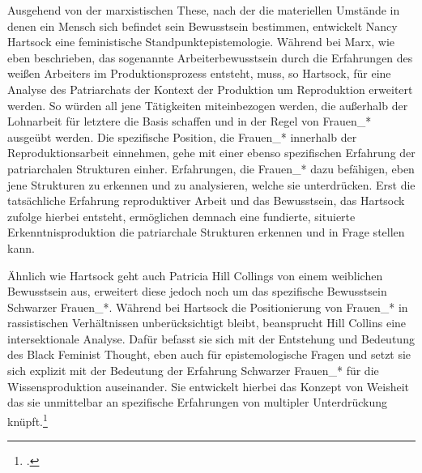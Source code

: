 Ausgehend von der marxistischen These, nach der die materiellen Umstände in
denen ein Mensch sich befindet sein Bewusstsein bestimmen, entwickelt Nancy
Hartsock eine feministische Standpunktepistemologie. Während bei Marx, wie eben
beschrieben, das sogenannte Arbeiterbewusstsein durch die Erfahrungen des
weißen Arbeiters im Produktionsprozess entsteht, muss, so Hartsock, für eine
Analyse des Patriarchats der Kontext der Produktion um Reproduktion erweitert
werden. So würden all jene Tätigkeiten miteinbezogen werden, die außerhalb der
Lohnarbeit für letztere die Basis schaffen und in der Regel von Frauen\_*
ausgeübt werden. Die spezifische Position, die Frauen\_* innerhalb der
Reproduktionsarbeit einnehmen, gehe mit einer ebenso spezifischen Erfahrung der
patriarchalen Strukturen einher. Erfahrungen, die Frauen\_* dazu befähigen, eben
jene Strukturen zu erkennen und zu analysieren, welche sie unterdrücken. Erst
die tatsächliche Erfahrung reproduktiver Arbeit und das Bewusstsein, das
Hartsock zufolge hierbei entsteht, ermöglichen demnach eine fundierte,
situierte Erkenntnisproduktion die patriarchale Strukturen erkennen und in
Frage stellen kann.\footnotemark {} 

Ähnlich wie Hartsock geht auch Patricia Hill Collings von einem weiblichen
Bewusstsein aus, erweitert diese jedoch noch um das spezifische Bewusstsein
Schwarzer Frauen\_*. Während bei Hartsock die Positionierung von Frauen\_* in
rassistischen Verhältnissen unberücksichtigt bleibt, beansprucht Hill Collins
eine intersektionale Analyse. Dafür befasst sie sich mit der Entstehung und
Bedeutung des Black Feminist Thought, eben auch für epistemologische Fragen und
setzt sie sich explizit mit der Bedeutung der Erfahrung Schwarzer Frauen\_* für
die Wissensproduktion auseinander. Sie entwickelt hierbei das Konzept von
Weisheit das sie unmittelbar an spezifische Erfahrungen von multipler
Unterdrückung knüpft.\footnotemark \footcitetext{hillcollins} 

